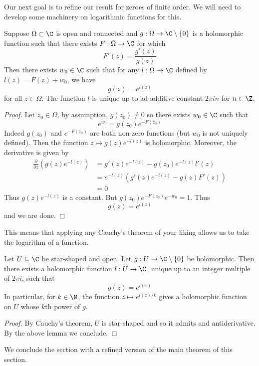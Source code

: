 \documentclass[a4paper]{article}
\begin{document}
Our next goal is to refine our result for zeroes of finite order. We will need to develop some machinery on logarithmic functions for this. 

\begin{lmm}{}{} Suppose $\Omega\subset\C$ is open and connected and $g:\Omega\to\C\setminus\{0\}$ is a holomorphic function such that there exists $F:\Omega\to\C$ for which $$F'(z)=\frac{g'(z)}{g(z)}$$ Then there exists $w_0\in\C$ such that for any $l:\Omega\to\C$ defined by $l(z)=F(z)+w_0$, we have $$g(z)=e^{l(z)}$$ for all $z\in\Omega$. The function $l$ is unique up to ad additive constant $2\pi i n$ for $n\in\Z$. \tcbline
\begin{proof}
Let $z_0\in\Omega$, by assumption, $g(z_0)\neq 0$ so there exists $w_0\in\C$ such that $$e^{w_0}=g(z_0)e^{-F(z_0)}$$ Indeed $g(z_0)$ and $e^{-F(z_0)}$ are both non-zero functions (but $w_0$ is not uniquely defined). Then the function $z\mapsto g(z)e^{-l(z)}$ is holomorphic. Moreover, the derivative is given by 
\begin{align*}
\frac{\partial}{\partial z}\left(g(z)e^{-l(z)}\right)&=g'(z)e^{-l(z)}-g(z_0)e^{-l(z)}l'(z)\\
&=e^{-l(z)}\left(g'(z)e^{-l(z)}-g(z)F'(z)\right)\\
&=0
\end{align*}
Thus $g(z)e^{-l(z)}$ is a constant. But $g(z_0)e^{-F(z_0)}e^{-w_0}=1$. Thus $$g(z)=e^{l(z)}$$ and we are done. 
\end{proof}
\end{lmm}

This means that applying any Cauchy's theorem of your liking allows us to take the logarithm of a function. 

\begin{crl}{}{} Let $U\subseteq\C$ be star-shaped and open. Let $g:U\to\C\setminus\{0\}$ be holomorphic. Then there exists a holomorphic function $l:U\to\C$, unique up to an integer multiple of $2\pi i$, such that $$g(z)=e^{l(z)}$$ In particular, for $k\in\N$, the function $z\mapsto e^{l(z)/k}$ gives a holomorphic function on $U$ whose $k$th power of $g$. \tcbline
\begin{proof}
By Cauchy's theorem, $U$ is star-shaped and so it admits and antiderivative. By the above lemma we conclude. 
\end{proof}
\end{crl}

We conclude the section with a refined version of the main theorem of this section. 
\end{document}
